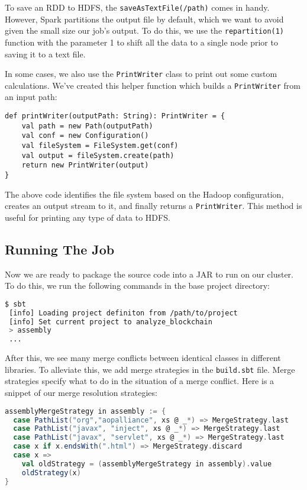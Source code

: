 \documentclass[9pt,twocolumn,twoside]{idsi}
\begin{document}
To save an RDD to HDFS, the \lstinline{saveAsTextFile(/path)} comes in handy. However, Spark partitions the output file by default, which we want to avoid given the small size our job's output. To do this, we use the \lstinline{repartition(1)} function with the parameter 1 to shift all the data to a single node prior to saving it to a text file.

In some cases, we also use the \lstinline{PrintWriter} class to print out some custom calculations. We've created this helper function which builds a \lstinline{PrintWriter} from an input path:

\begin{lstlisting}
def printWriter(outputPath: String): PrintWriter = {
    val path = new Path(outputPath)
    val conf = new Configuration()
    val fileSystem = FileSystem.get(conf)
    val output = fileSystem.create(path)
    return new PrintWriter(output)
}
\end{lstlisting}

The above code identifies the file system based on the Hadoop configuration, creates an output stream to it, and finally returns a \lstinline{PrintWriter}. This method is useful for printing any type of data to HDFS.

\subsection{Running The Job}
Now we are ready to package the source code into a JAR to run on our cluster. To do this, we run the following commands in the base project directory:

\begin{lstlisting}[language=bash]
 $ sbt
 [info] Loading project definiton from /path/to/project
 [info] Set current project to analyze_blockchain
 > assembly
 ...
\end{lstlisting}

After this, we see many merge conflicts between identical classes in different libraries. To alleviate this, we add merge strategies in the \lstinline{build.sbt} file. Merge strategies specify what to do in the situation of a merge conflict. Here is a snippet of our merge resolution strategies:

\begin{lstlisting}[language=Scala]
assemblyMergeStrategy in assembly := {
  case PathList("org","aopalliance", xs @ _*) => MergeStrategy.last
  case PathList("javax", "inject", xs @ _*) => MergeStrategy.last
  case PathList("javax", "servlet", xs @ _*) => MergeStrategy.last
  case x if x.endsWith(".html") => MergeStrategy.discard
  case x =>
    val oldStrategy = (assemblyMergeStrategy in assembly).value
    oldStrategy(x)
}
\end{lstlisting}
\end{document}
